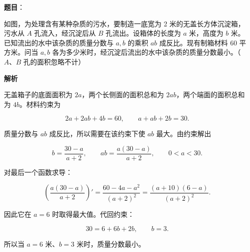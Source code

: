 \begin{answer}

\textbf{题目}：

如图，为处理含有某种杂质的污水，要制造一底宽为 2 米的无盖长方体沉淀箱，污水从 $A$ 孔流入，经沉淀后从 $B$ 孔流出。设箱体的长度为 $a$ 米，高度为 $b$ 米。已知流出的水中该杂质的质量分数与 $a,b$ 的乘积 $ab$ 成反比。现有制箱材料 60 平方米。问当 $a,b$ 各为多少米时，经沉淀后流出的水中该杂质的质量分数最小。（$A\text{、}B$ 孔的面积忽略不计）
\nopagebreak[4]
\begin{center}\end{center}
\nopagebreak[4]
\textbf{解析}

无盖箱子的底面面积为 $2a$，两个长侧面的面积总和为 $2ab$，两个端面的面积总和为 $4b$。材料约束为

\nopagebreak[4]
\[
2a+2ab+4b=60,
\qquad
a+ab+2b=30.
\]

质量分数与 $ab$ 成反比，所以需要在该约束下使 $ab$ 最大。由约束解出

\nopagebreak[4]
\[
b=\frac{30-a}{a+2},
\qquad
ab=\frac{a(30-a)}{a+2},
\qquad 0<a<30.
\]

对最后一个函数求导：

\nopagebreak[4]
\[
\left(\frac{a(30-a)}{a+2}\right)'
=\frac{60-4a-a^2}{(a+2)^2}
=\frac{(a+10)(6-a)}{(a+2)^2}.
\]

因此它在 $a=6$ 时取得最大值。代回约束：

\nopagebreak[4]
\[
30=6+6b+2b,
\qquad b=3.
\]

所以当 $a=6$ 米、$b=3$ 米时，质量分数最小。


\end{answer}
